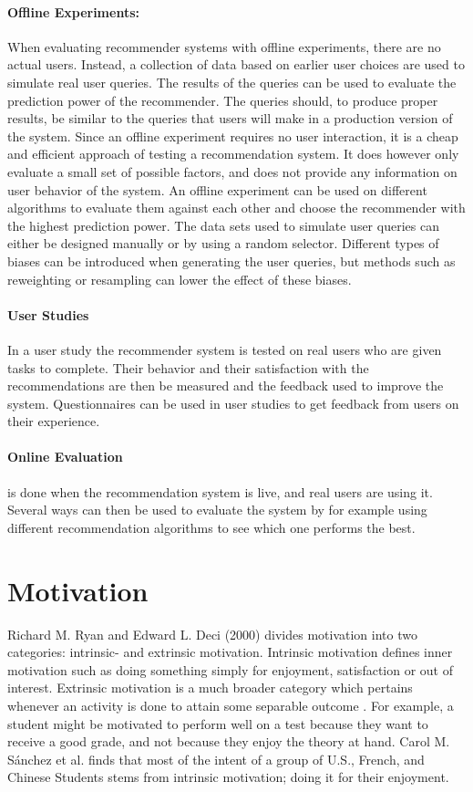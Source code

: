 \paragraph{Offline Experiments:} When evaluating recommender systems with offline experiments, there are no actual users. Instead, a collection of data based on earlier user choices are used to simulate real user queries. The results of the queries can be used to evaluate the prediction power of the recommender. The queries should, to produce proper results, be similar to the queries that users will make in a production version of the system. Since an offline experiment requires no user interaction, it is a cheap and efficient approach of testing a recommendation system. It does however only evaluate a small set of possible factors, and does not provide any information on user behavior of the system.  An offline experiment can be used on different algorithms to evaluate them against each other and choose the recommender with the highest prediction power. The data sets used to simulate user queries can either be designed manually or by using a random selector. Different types of biases can be introduced when generating the user queries, but methods such as reweighting or resampling can lower the effect of these biases. 

\paragraph{User Studies} In a user study the recommender system is tested on real users who are given tasks to complete. Their behavior and their satisfaction with the recommendations are then be measured and the feedback used to improve the system. Questionnaires can be used in user studies to get feedback from users on their experience. 

\paragraph{Online Evaluation} is done when the recommendation system is live, and real users are using it. Several ways can then be used to evaluate the system by for example using different recommendation algorithms to see which one performs the best.


\iffalse
\section{Motivation}
Richard M. Ryan and Edward L. Deci (2000)\cite{ryan2000intrinsic} divides motivation into two categories: intrinsic- and extrinsic motivation. Intrinsic motivation defines inner motivation such as doing something simply for enjoyment, satisfaction or out of interest. Extrinsic motivation is a much broader category which pertains whenever an activity is done to attain some separable outcome \cite{ryan2000intrinsic}. For example, a student might be motivated to perform well on a test because they want to receive a good grade, and not because they enjoy the theory at hand. Carol M. Sánchez et al. \cite{sanchez2006motivations} finds that most of the intent of a group of U.S., French, and Chinese Students stems from intrinsic motivation; doing it for their enjoyment. 

